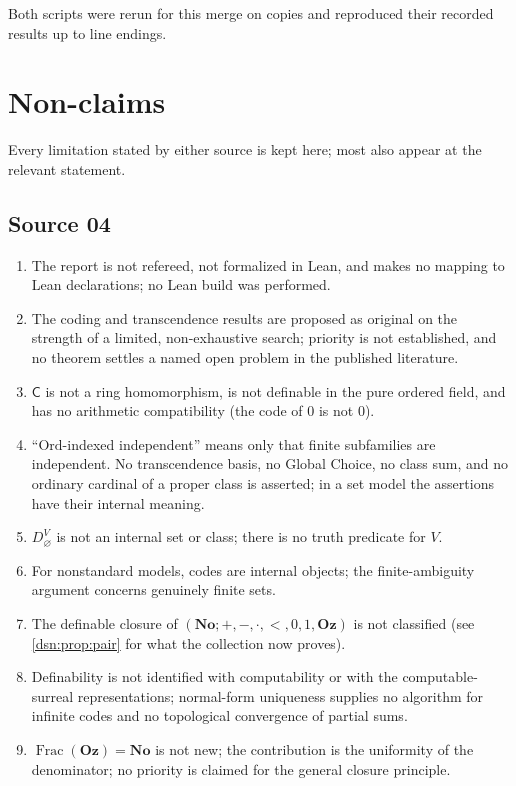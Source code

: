 \documentclass[11pt,a4paper]{article}
\numberwithin{equation}{section}
\theoremstyle{definition}
\theoremstyle{remark}
\newcommand{\No}{\mathbf{No}}
\newcommand{\Oz}{\mathbf{Oz}}
\newcommand{\Ord}{\mathrm{Ord}}
\newcommand{\Frac}{\operatorname{Frac}}
\newcommand{\Code}{\mathsf C}
\begin{document}
Both scripts were rerun for this merge on copies and reproduced their
recorded results up to line endings.

\section{Non-claims}\label{dsn:app:nonclaims}

Every limitation stated by either source is kept here; most also appear at
the relevant statement.

\subsection{Source 04}
\begin{enumerate}[label=N4.\arabic*]
\item The report is not refereed, not formalized in Lean, and makes no
mapping to Lean declarations; no Lean build was performed.
\item The coding and transcendence results are proposed as original on the
strength of a limited, non-exhaustive search; priority is not established,
and no theorem settles a named open problem in the published literature.
\item $\Code$ is not a ring homomorphism, is not definable in the pure
ordered field, and has no arithmetic compatibility (the code of $0$ is not
$0$).
\item ``$\Ord$-indexed independent'' means only that finite subfamilies are
independent. No transcendence basis, no Global Choice, no class sum, and no
ordinary cardinal of a proper class is asserted; in a set model the
assertions have their internal meaning.
\item $D^V_\varnothing$ is not an internal set or class; there is no truth
predicate for $V$.
\item For nonstandard models, codes are internal objects; the
finite-ambiguity argument concerns genuinely finite sets.
\item The definable closure of $(\No;+,-,\cdot,<,0,1,\Oz)$ is not classified
(see \cref{dsn:prop:pair} for what the collection now proves).
\item Definability is not identified with computability or with the
computable-surreal representations; normal-form uniqueness supplies no
algorithm for infinite codes and no topological convergence of partial
sums.
\item $\Frac(\Oz)=\No$ is not new; the contribution is the uniformity of the
denominator; no priority is claimed for the general closure principle.

\end{enumerate}
\end{document}
